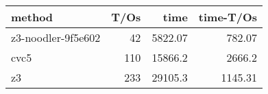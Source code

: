 \begin{tabular}{lrrr}
\hline
 method             &   T/Os &     time &   time-T/Os \\
\hline
 z3-noodler-9f5e602 &     42 &  5822.07 &      782.07 \\
 cvc5               &    110 & 15866.2  &     2666.2  \\
 z3                 &    233 & 29105.3  &     1145.31 \\
\hline
\end{tabular}
